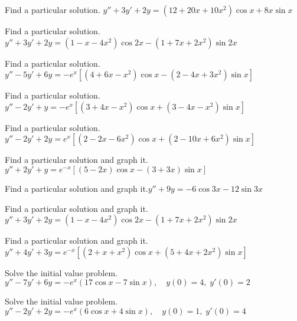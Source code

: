 \documentclass{ximera}
\begin{document}
\begin{problem}\label{exer:5.5.13}   Find a particular solution. $y''+3y'+2y=(12+20x+10x^2)\cos x+8x\sin x$
\end{problem}

\begin{problem}\label{exer:5.5.14} Find a particular solution. $y''+3y'+2y=(1-x-4x^2)\cos2x-(1+7x+2x^2)\sin2x$
\end{problem}

\begin{problem}\label{exer:5.5.15}
Find a particular solution. $y''-5y'+6y=-e^x\left[(4+6x-x^2)\cos x-(2-4x+3x^2)\sin x\right]$
\end{problem}

\begin{problem}\label{exer:5.5.16}
Find a particular solution. $y''-2y'+y=-e^x\left[(3+4x-x^2)\cos x+(3-4x-x^2)\sin x\right]$
\end{problem}

\begin{problem}\label{exer:5.5.17}
Find a particular solution. $y''-2y'+2y=e^x\left[(2-2x-6x^2)\cos x+(2-10x+6x^2)\sin x\right]$
\end{problem}

\begin{problem}\label{exer:5.5.18} Find a particular solution and graph
it. $y''+2y'+y=e^{-x}\left[(5-2x)\cos
x-(3+3x)\sin x\right]$
\end{problem}

\begin{problem}\label{exer:5.5.19} Find a particular solution and graph
it.$y''+9y=-6\cos 3x-12\sin 3x$
\end{problem}

\begin{problem}\label{exer:5.5.20} Find a particular solution and graph
it. $y''+3y'+2y=(1-x-4x^2)\cos2x-(1+7x+2x^2)\sin2x$
\end{problem}

\begin{problem}\label{exer:5.5.21} Find a particular solution and graph
it.
$y''+4y'+3y=e^{-x}\left[(2+x+x^2)\cos x+(5+4x+2x^2)\sin x\right]$
\end{problem}

\begin{problem}\label{exer:5.5.22}
 Solve the
initial value problem. $y''-7y'+6y=-e^x(17\cos x-7\sin x), \quad   y(0)=4,\;  y'(0)=2$
\end{problem}

\begin{problem}\label{exer:5.5.23}
Solve the
initial value problem. $y''-2y'+2y=-e^x(6\cos x+4\sin x), \quad   y(0)=1,\;  y'(0)=4$
\end{problem}
\end{document}

